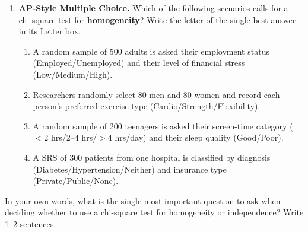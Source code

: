 \documentclass[10pt]{article}
\begin{document}
\begin{enumerate}
        \begin{enumerate}[label=(\alph*)]
          \item Identify the test type and write the hypotheses.


          \newpage
          \item Write out the two conditions for this chi-square test.
                Can either condition be verified without seeing the actual data table?
                Explain.

        \end{enumerate}

  \item \textbf{AP-Style Multiple Choice.} Which of the following scenarios calls for
        a chi-square test for \textbf{homogeneity}? Write the letter of the single best answer in its Letter box.

        \begin{enumerate}[label=(\Alph*)]
          \item A random sample of 500 adults is asked their employment status
                (Employed/Unemployed) and their level of financial stress (Low/Medium/High).
          \item Researchers randomly select 80 men and 80 women and record each person's
                preferred exercise type (Cardio/Strength/Flexibility).
          \item A random sample of 200 teenagers is asked their screen-time category
                ($<$2 hrs/$2$--$4$ hrs/$>$4 hrs/day) and their sleep quality (Good/Poor).
          \item A SRS of 300 patients from one hospital is classified by diagnosis
                (Diabetes/Hypertension/Neither) and insurance type (Private/Public/None).
                      \par\nobreak\rule{0pt}{0.45in}\hfill{}
        \end{enumerate}

\end{enumerate}

\begin{reflectionbox}
In your own words, what is the single most important question to ask when deciding whether
to use a chi-square test for homogeneity or independence? Write 1--2 sentences.
\end{reflectionbox}
\end{document}
